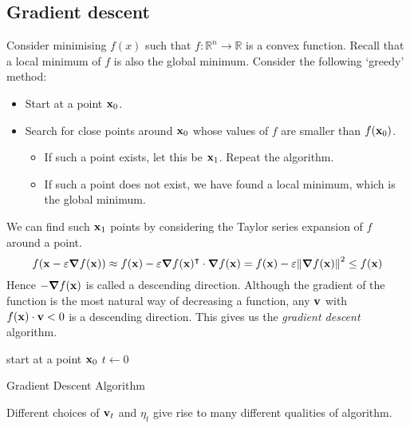 \subsection{Gradient descent}
Consider minimising \(f(x)\) such that \(f \colon \mathbb R^n \to \mathbb R\) is a convex function.
Recall that a local minimum of \(f\) is also the global minimum.
Consider the following `greedy' method:
\begin{itemize}
	\item Start at a point \(\vb x_0\).
	\item Search for close points around \(\vb x_0\) whose values of \(f\) are smaller than \(f(\vb x_0)\).
	      \begin{itemize}
		      \item If such a point exists, let this be \(\vb x_1\).
		            Repeat the algorithm.
		      \item If such a point does not exist, we have found a local minimum, which is the global minimum.
	      \end{itemize}
\end{itemize}
We can find such \(\vb x_1\) points by considering the Taylor series expansion of \(f\) around a point.
\[
	f(\vb x - \varepsilon\grad{f(\vb x)}) \approx f(\vb x) - \varepsilon \grad{f(\vb x)}^\intercal \cdot \grad{f(\vb x)} = f(\vb x) - \varepsilon\norm{\grad{f(\vb x)}}^2 \leq f(\vb x)
\]
Hence \(-\grad{f(\vb x)}\) is called a descending direction.
Although the gradient of the function is the most natural way of decreasing a function, any \(\vb v\) with \(f(\vb x) \cdot \vb v < 0\) is a descending direction.
This gives us the \textit{gradient descent} algorithm.

\begin{algorithm*}[H]
	\SetAlgoLined{}
	start at a point \(\vb x_0\)\;
	\(t \leftarrow 0\)\;
	\caption{Gradient Descent Algorithm}
\end{algorithm*}

Different choices of \(\vb v_t\) and \(\eta_t\) give rise to many different qualities of algorithm.

